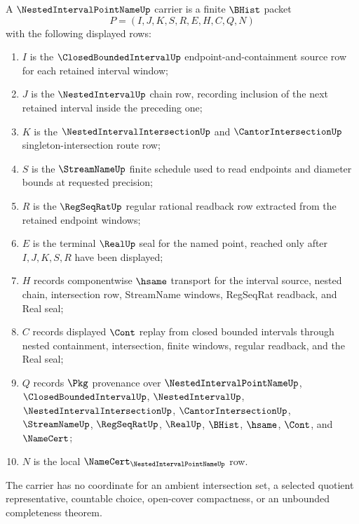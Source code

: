 \begin{definition}
\label{def:nested-interval-point-name-carrier}
A $\NestedIntervalPointNameUp$ carrier is a finite $\BHist$ packet
$$
P=(I,J,K,S,R,E,H,C,Q,N)
$$
with the following displayed rows:
\begin{enumerate}
\item $I$ is the $\ClosedBoundedIntervalUp$ endpoint-and-containment source row for each retained interval window;
\item $J$ is the $\NestedIntervalUp$ chain row, recording inclusion of the next retained interval inside the preceding one;
\item $K$ is the $\NestedIntervalIntersectionUp$ and $\CantorIntersectionUp$ singleton-intersection route row;
\item $S$ is the $\StreamNameUp$ finite schedule used to read endpoints and diameter bounds at requested precision;
\item $R$ is the $\RegSeqRatUp$ regular rational readback row extracted from the retained endpoint windows;
\item $E$ is the terminal $\RealUp$ seal for the named point, reached only after $I,J,K,S,R$ have been displayed;
\item $H$ records componentwise $\hsame$ transport for the interval source, nested chain, intersection row, StreamName windows, RegSeqRat readback, and Real seal;
\item $C$ records displayed $\Cont$ replay from closed bounded intervals through nested containment, intersection, finite windows, regular readback, and the Real seal;
\item $Q$ records $\Pkg$ provenance over $\NestedIntervalPointNameUp$, $\ClosedBoundedIntervalUp$, $\NestedIntervalUp$, $\NestedIntervalIntersectionUp$, $\CantorIntersectionUp$, $\StreamNameUp$, $\RegSeqRatUp$, $\RealUp$, $\BHist$, $\hsame$, $\Cont$, and $\NameCert$;
\item $N$ is the local $\NameCert_{\NestedIntervalPointNameUp}$ row.
\end{enumerate}
The carrier has no coordinate for an ambient intersection set, a selected quotient representative, countable choice, open-cover compactness, or an unbounded completeness theorem.
\end{definition}

